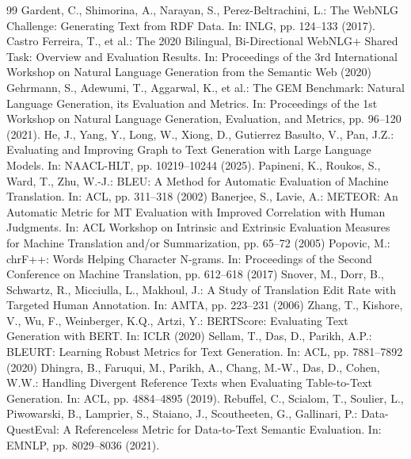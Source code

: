 \begin{thebibliography}{99}
 Gardent, C., Shimorina, A., Narayan, S., Perez-Beltrachini, L.: The WebNLG Challenge: Generating Text from RDF Data. In: INLG, pp. 124--133 (2017). 
 Castro Ferreira, T., et al.: The 2020 Bilingual, Bi-Directional WebNLG+ Shared Task: Overview and Evaluation Results. In: Proceedings of the 3rd International Workshop on Natural Language Generation from the Semantic Web (2020)
 Gehrmann, S., Adewumi, T., Aggarwal, K., et al.: The GEM Benchmark: Natural Language Generation, its Evaluation and Metrics. In: Proceedings of the 1st Workshop on Natural Language Generation, Evaluation, and Metrics, pp. 96--120 (2021). 
 He, J., Yang, Y., Long, W., Xiong, D., Gutierrez Basulto, V., Pan, J.Z.: Evaluating and Improving Graph to Text Generation with Large Language Models. In: NAACL-HLT, pp. 10219--10244 (2025). 
 Papineni, K., Roukos, S., Ward, T., Zhu, W.-J.: BLEU: A Method for Automatic Evaluation of Machine Translation. In: ACL, pp. 311--318 (2002)
 Banerjee, S., Lavie, A.: METEOR: An Automatic Metric for MT Evaluation with Improved Correlation with Human Judgments. In: ACL Workshop on Intrinsic and Extrinsic Evaluation Measures for Machine Translation and/or Summarization, pp. 65--72 (2005)
 Popovic, M.: chrF++: Words Helping Character N-grams. In: Proceedings of the Second Conference on Machine Translation, pp. 612--618 (2017)
 Snover, M., Dorr, B., Schwartz, R., Micciulla, L., Makhoul, J.: A Study of Translation Edit Rate with Targeted Human Annotation. In: AMTA, pp. 223--231 (2006)
 Zhang, T., Kishore, V., Wu, F., Weinberger, K.Q., Artzi, Y.: BERTScore: Evaluating Text Generation with BERT. In: ICLR (2020)
 Sellam, T., Das, D., Parikh, A.P.: BLEURT: Learning Robust Metrics for Text Generation. In: ACL, pp. 7881--7892 (2020)
 Dhingra, B., Faruqui, M., Parikh, A., Chang, M.-W., Das, D., Cohen, W.W.: Handling Divergent Reference Texts when Evaluating Table-to-Text Generation. In: ACL, pp. 4884--4895 (2019). 
 Rebuffel, C., Scialom, T., Soulier, L., Piwowarski, B., Lamprier, S., Staiano, J., Scoutheeten, G., Gallinari, P.: Data-QuestEval: A Referenceless Metric for Data-to-Text Semantic Evaluation. In: EMNLP, pp. 8029--8036 (2021). 

\end{thebibliography}
